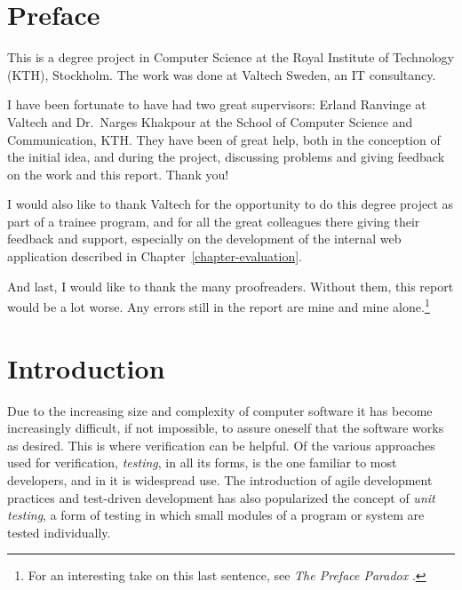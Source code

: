 \documentclass[a4paper,11pt]{kth-mag}
\theoremstyle{definition}
\begin{document}

\pagestyle{newchap}
\chapter*{Preface}

This is a degree project in Computer Science at the Royal Institute of
Technology (KTH), Stockholm. The work was done at Valtech Sweden, an IT
consultancy.

I have been fortunate to have had two great supervisors: Erland Ranvinge at
Valtech and Dr.\ Narges Khakpour at the School of Computer Science and
Communication, KTH\@. They have been of great help, both in the conception of
the initial idea, and during the project, discussing problems and giving
feedback on the work and this report. Thank you!

I would also like to thank Valtech for the opportunity to do this degree
project as part of a trainee program, and for all the great colleagues there
giving their feedback and support, especially on the development of the
internal web application described in Chapter~\ref{chapter-evaluation}.

And last, I would like to thank the many proofreaders. Without them, this
report would be a lot worse. Any errors still in the report are mine and mine
alone.\footnote{For an interesting take on this last sentence, see \emph{The
  Preface Paradox} \cite{makinson65prefaceparadox,
williams87prefaceparadoxdissolved}.}

\clearpage

\pagestyle{newchap}
\tableofcontents*
\mainmatter





\pagestyle{newchap}
\chapter{Introduction} \label{chapter-introduction}

Due to the increasing size and complexity of computer software it has become
increasingly difficult, if not impossible, to assure oneself that the software
works as desired. This is where verification can be helpful. Of the various
approaches used for verification, \textit{testing}, in all its forms, is the
one familiar to most developers, and in it is widespread use. The introduction
of agile development practices and test-driven development has also popularized
the concept of \textit{unit testing}, a form of testing in which small modules
of a program or system are tested individually.
\end{document}
